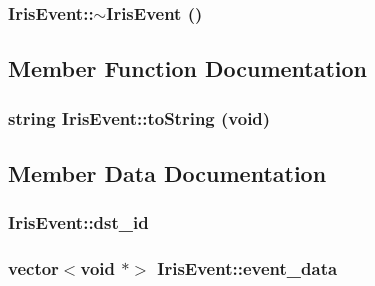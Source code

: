 \hypertarget{classIrisEvent_5840e399aa6f659e30dc7757e71dc28b}{
\subsubsection[{$\sim$IrisEvent}]{\setlength{\rightskip}{0pt plus 5cm}IrisEvent::$\sim$IrisEvent ()}}
\label{classIrisEvent_5840e399aa6f659e30dc7757e71dc28b}




\subsection{Member Function Documentation}
\hypertarget{classIrisEvent_0af2990076aab1512a61908435010824}{
\subsubsection[{toString}]{\setlength{\rightskip}{0pt plus 5cm}string IrisEvent::toString (void)}}
\label{classIrisEvent_0af2990076aab1512a61908435010824}




\subsection{Member Data Documentation}
\hypertarget{classIrisEvent_274c046ce64d15b914c0b8cbdebfea31}{
\subsubsection[{dst\_\-id}]{ {\bf IrisEvent::dst\_\-id}}}
\label{classIrisEvent_274c046ce64d15b914c0b8cbdebfea31}


\hypertarget{classIrisEvent_26464fd0f931717a1e83b91111efc7b4}{
\subsubsection[{event\_\-data}]{\setlength{\rightskip}{0pt plus 5cm}vector$<$void $\ast$$>$ {\bf IrisEvent::event\_\-data}}}
\label{classIrisEvent_26464fd0f931717a1e83b91111efc7b4}


